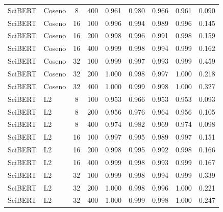 \begin{table}[H]
\begin{tabular}{|l|l|c|c|c|c|c|c|c|}
SciBERT & Coseno & 8 & 400 & 0.961 & 0.980 & 0.966 & 0.961 & 0.090 \\
SciBERT & Coseno & 16 & 100 & 0.996 & 0.994 & 0.989 & 0.996 & 0.145 \\
SciBERT & Coseno & 16 & 200 & 0.998 & 0.996 & 0.991 & 0.998 & 0.159 \\
SciBERT & Coseno & 16 & 400 & 0.999 & 0.998 & 0.994 & 0.999 & 0.162 \\
SciBERT & Coseno & 32 & 100 & 0.999 & 0.997 & 0.993 & 0.999 & 0.459 \\
SciBERT & Coseno & 32 & 200 & 1.000 & 0.998 & 0.997 & 1.000 & 0.218 \\
SciBERT & Coseno & 32 & 400 & 1.000 & 0.999 & 0.998 & 1.000 & 0.327 \\
SciBERT & L2 & 8 & 100 & 0.953 & 0.966 & 0.953 & 0.953 & 0.093 \\
SciBERT & L2 & 8 & 200 & 0.956 & 0.976 & 0.964 & 0.956 & 0.105 \\
SciBERT & L2 & 8 & 400 & 0.974 & 0.982 & 0.969 & 0.974 & 0.098 \\
SciBERT & L2 & 16 & 100 & 0.997 & 0.995 & 0.989 & 0.997 & 0.151 \\
SciBERT & L2 & 16 & 200 & 0.998 & 0.995 & 0.992 & 0.998 & 0.166 \\
SciBERT & L2 & 16 & 400 & 0.999 & 0.998 & 0.993 & 0.999 & 0.167 \\
SciBERT & L2 & 32 & 100 & 0.999 & 0.998 & 0.994 & 0.999 & 0.339 \\
SciBERT & L2 & 32 & 200 & 1.000 & 0.998 & 0.996 & 1.000 & 0.221 \\
SciBERT & L2 & 32 & 400 & 1.000 & 0.999 & 0.998 & 1.000 & 0.247 \\
\hline
\end{tabular}
\end{table}